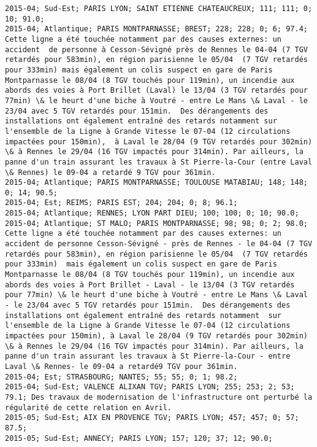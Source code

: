 \documentclass{article}
\begin{document}
\begin{Verbatim}[commandchars=\\\{\}]
2015-04; Sud-Est; PARIS LYON; SAINT ETIENNE CHATEAUCREUX; 111; 111; 0; 10; 91.0; 
2015-04; Atlantique; PARIS MONTPARNASSE; BREST; 228; 228; 0; 6; 97.4; Cette ligne a été touchée notamment par des causes externes: un accident  de personne à Cesson-Sévigné près de Rennes le 04-04 (7 TGV retardés pour 583min), en région parisienne le 05/04  (7 TGV retardés pour 333min) mais également un colis suspect en gare de Paris Montparnasse le 08/04 (8 TGV touchés pour 119min), un incendie aux abords des voies à Port Brillet (Laval) le 13/04 (3 TGV retardés pour 77min) \& le heurt d'une biche à Voutré - entre Le Mans \& Laval - le 23/04 avec 5 TGV retardés pour 151min.  Des dérangements des installations ont également entraîné des retards notamment sur l'ensemble de la Ligne à Grande Vitesse le 07-04 (12 circulations impactées pour 150min),  à Laval le 28/04 (9 TGV retardés pour 302min) \& à Rennes le 29/04 (16 TGV impactés pour 314min). Par ailleurs, la panne d'un train assurant les travaux à St Pierre-la-Cour (entre Laval \& Rennes) le 09-04 a retardé 9 TGV pour 361min.
2015-04; Atlantique; PARIS MONTPARNASSE; TOULOUSE MATABIAU; 148; 148; 0; 14; 90.5; 
2015-04; Est; REIMS; PARIS EST; 204; 204; 0; 8; 96.1; 
2015-04; Atlantique; RENNES; LYON PART DIEU; 100; 100; 0; 10; 90.0; 
2015-04; Atlantique; ST MALO; PARIS MONTPARNASSE; 98; 98; 0; 2; 98.0; Cette ligne a été touchée notamment par des causes externes: un accident de personne Cesson-Sévigné - près de Rennes - le 04-04 (7 TGV retardés pour 583min), en région parisienne le 05/04  (7 TGV retardés pour 333min)  mais également un colis suspect en gare de Paris Montparnasse le 08/04 (8 TGV touchés pour 119min), un incendie aux abords des voies à Port Brillet - Laval - le 13/04 (3 TGV retardés pour 77min) \& le heurt d'une biche à Voutré - entre Le Mans \& Laval - le 23/04 avec 5 TGV retardés pour 151min.  Des dérangements des installations ont également entraîné des retards notamment  sur l'ensemble de la Ligne à Grande Vitesse le 07-04 (12 circulations impactées pour 150min), à Laval le 28/04 (9 TGV retardés pour 302min) \& à Rennes le 29/04 (16 TGV impactés pour 314min). Par ailleurs, la panne d'un train assurant les travaux à St Pierre-la-Cour - entre Laval \& Rennes- le 09-04 a retardé9 TGV pour 361min.
2015-04; Est; STRASBOURG; NANTES; 55; 55; 0; 1; 98.2; 
2015-04; Sud-Est; VALENCE ALIXAN TGV; PARIS LYON; 255; 253; 2; 53; 79.1; Des travaux de modernisation de l'infrastructure ont perturbé la régularité de cette relation en Avril.
2015-05; Sud-Est; AIX EN PROVENCE TGV; PARIS LYON; 457; 457; 0; 57; 87.5; 
2015-05; Sud-Est; ANNECY; PARIS LYON; 157; 120; 37; 12; 90.0; 

\end{Verbatim}
\end{document}
